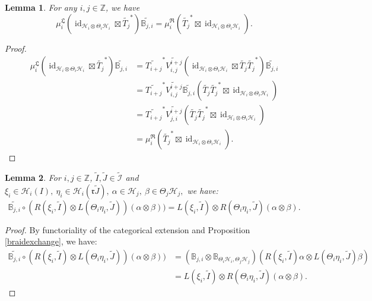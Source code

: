 \documentclass{article}
\newtheorem{lemma}{Lemma}
\newcommand{\hilb}{\mathcal{H}}
\newcommand{\Z}{\mathbb{Z}}
\begin{document}
\begin{lemma}\label{commuLR}
  For any $i,j \in \Z$, we have  
  \[
  \mu_i^{\mathfrak{L}}(\operatorname{id}_{\hilb_i\otimes \Theta_i\hilb_i}\boxtimes\widetilde{T_j}^*)\widetilde{\mathbb{B}_{j,i}} = \mu_i^{\mathfrak{R}}(\widetilde{T_j}^*\boxtimes\operatorname{id}_{\hilb_i\otimes \Theta_i\hilb_i}).
  \]
\end{lemma}
\begin{proof}

\begin{align*}
    \mu_i^{\mathfrak{L}}(\operatorname{id}_{\hilb_i\otimes \Theta_i\hilb_i}\boxtimes\widetilde{T_j}^*)\widetilde{\mathbb{B}_{j,i}}  &=\widetilde{T_{i+j}}^*\widetilde{V^{i+j}_{i,j}}(\operatorname{id}_{\hilb_i\otimes \Theta_i\hilb_i}\boxtimes\widetilde{T_j}\widetilde{T_j}^*)\widetilde{\mathbb{B}_{j,i}} \\
    & = \widetilde{T_{i+j}}^*\widetilde{V^{i+j}_{i,j}}\widetilde{\mathbb{B}_{j,i}} (\widetilde{T_j}\widetilde{T_j}^*\boxtimes\operatorname{id}_{\hilb_i\otimes \Theta_i\hilb_i})\\
    &=  \widetilde{T_{i+j}}^*\widetilde{V^{i+j}_{j,i}}(\widetilde{T_j}\widetilde{T_j}^*\boxtimes\operatorname{id}_{\hilb_i\otimes \Theta_i\hilb_i})\\
    & = \mu_i^{\mathfrak{R}}(\widetilde{T_j}^*\boxtimes\operatorname{id}_{\hilb_i\otimes \Theta_i\hilb_i}).
\end{align*}
    
\end{proof}

\begin{lemma}\label{BR LR}
    For $i,j\in\Z$, $\widetilde{I}, \widetilde{J} \in \widetilde{\mathcal{I}} $ and $\xi_i\in\hilb_i(I),\ \eta_i \in \hilb_i(\mathfrak{r}\widetilde{J}), \ \alpha \in \hilb_j, \ \beta \in \Theta_j\hilb_j,$
we have: 
\[
\widetilde{\mathbb{B}_{j,i}} \circ (R(\xi_i,\widetilde{I})\otimes L(\Theta_i\eta_i,\widetilde{J}))(\alpha\otimes\beta)) = 
                                         L(\xi_i,\widetilde{I})\otimes R(\Theta_i\eta_i,\widetilde{J})(\alpha\otimes\beta).
\]
\end{lemma}
\begin{proof}
By functoriality of the categorical extension and Proposition \ref{braidexchange}, we have: 
    \begin{align*}
       \widetilde{\mathbb{B}_{j,i}} \circ (R(\xi_i,\widetilde{I})\otimes L(\Theta_i\eta_i,\widetilde{J}))(\alpha\otimes\beta)) &= (\mathbb{B}_{j,i}\otimes \mathbb{B}_{\Theta_i\hilb_i, \Theta_j\hilb_j})(R(\xi_i,\widetilde{I})\alpha \otimes L(\Theta_i\eta_i,\widetilde{J})\beta)   \\
       & = L(\xi_i,\widetilde{I})\otimes R(\Theta_i\eta_i,\widetilde{J}) (\alpha \otimes \beta).
    \end{align*}
\end{proof}
\end{document}
